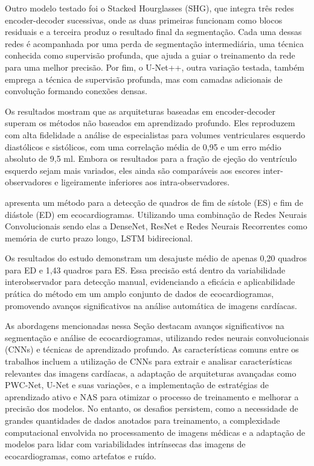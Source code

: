 Outro modelo testado foi o Stacked Hourglasses (SHG), que integra três redes encoder-decoder sucessivas, onde as duas primeiras funcionam como blocos residuais e a terceira produz o resultado final da segmentação. Cada uma dessas redes é acompanhada por uma perda de segmentação intermediária, uma técnica conhecida como supervisão profunda, que ajuda a guiar o treinamento da rede para uma melhor precisão. Por fim, o U-Net++, outra variação testada, também emprega a técnica de supervisão profunda, mas com camadas adicionais de convolução formando conexões densas.

Os resultados mostram que as arquiteturas baseadas em encoder-decoder superam os métodos não baseados em aprendizado profundo. Eles reproduzem com alta fidelidade a análise de especialistas para volumes ventriculares esquerdo diastólicos e sistólicos, com uma correlação média de 0,95 e um erro médio absoluto de 9,5 ml. Embora os resultados para a fração de ejeção do ventrículo esquerdo sejam mais variados, eles ainda são comparáveis aos escores inter-observadores e ligeiramente inferiores aos intra-observadores.


\textcite{8586941} apresenta um método  para a detecção de quadros de fim de sístole (ES) e fim de diástole (ED) em ecocardiogramas. Utilizando uma combinação de Redes Neurais Convolucionais sendo elas a DenseNet, ResNet e Redes Neurais Recorrentes como memória de curto prazo longo, LSTM bidirecional.

Os resultados do estudo demonstram um desajuste médio de apenas 0,20 quadros para ED e 1,43 quadros para ES. Essa precisão está dentro da variabilidade interobservador para detecção manual, evidenciando a eficácia e aplicabilidade prática do método em um amplo conjunto de dados de ecocardiogramas, promovendo avanços significativos na análise automática de imagens cardíacas.

As abordagens mencionadas nessa Seção  destacam avanços significativos na segmentação e análise de ecocardiogramas, utilizando redes neurais convolucionais (CNNs) e técnicas de aprendizado profundo. As características comuns entre os trabalhos incluem a utilização de CNNs para extrair e analisar características relevantes das imagens cardíacas, a adaptação de arquiteturas avançadas como PWC-Net, U-Net e suas variações, e a implementação de estratégias de aprendizado ativo e NAS para otimizar o processo de treinamento e melhorar a precisão dos modelos. No entanto, os desafios persistem, como a necessidade de grandes quantidades de dados anotados para treinamento, a complexidade computacional envolvida no processamento de imagens médicas e a adaptação de modelos para lidar com variabilidades intrínsecas das imagens de ecocardiogramas, como artefatos e ruído.

